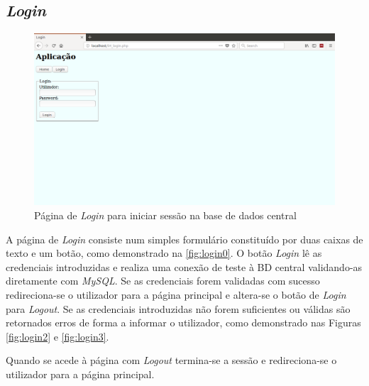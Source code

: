 \documentclass[11pt,twoside,a4paper]{report}
\begin{document}
\newpage
\subsection{\textit{Login}}
\label{subchap:login}
\begin{figure}[H]
	\begin{center}
		\includegraphics[trim={0 10cm 0 0},clip,width=1\textwidth]{login01} %
		\caption{Página de \textit{Login} para iniciar sessão na base de dados central}
		\label{fig:login0}
	\end{center}
\end{figure}
A página de \textit{Login} consiste num simples formulário constituído por duas caixas de texto e um botão, como demonstrado na \autoref{fig:login0}. O botão \textit{Login} lê as credenciais introduzidas e realiza uma conexão de teste à BD central validando-as diretamente com \textit{MySQL}. Se as credenciais forem validadas com sucesso redireciona-se o utilizador para a página principal e altera-se o botão de \textit{Login} para \textit{Logout}. Se as credenciais introduzidas não forem suficientes ou válidas são retornados erros de forma a informar o utilizador, como demonstrado nas Figuras \ref{fig:login2} e \ref{fig:login3}.\par 
Quando se acede à página com \textit{Logout} termina-se a sessão e redireciona-se o utilizador para a página principal.
\end{document}
